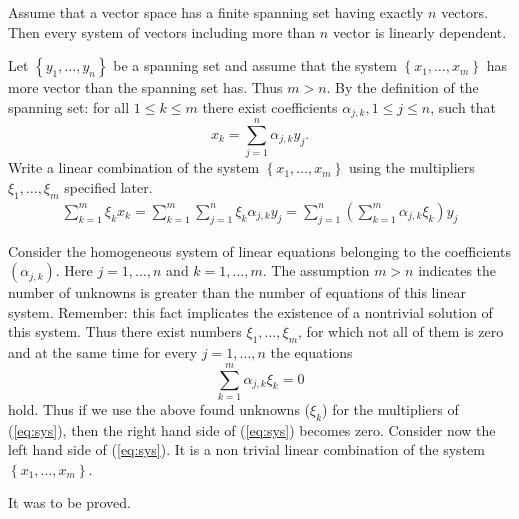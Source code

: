 \begin{frame}
\begin{lemma}[Steinitz]
    Assume that a vector space has a finite spanning set having exactly $n$ vectors.
    Then every system of vectors including more than $n$ vector is linearly dependent.
\end{lemma}
    Let $\left\{ y_1,\ldots,y_n \right\}$ be a spanning set
    and assume that the system  $\left\{ x_1,\ldots,x_m \right\}$ has more vector than the spanning set has.
    Thus $m>n$.
    By the definition of the spanning set: for all $1\leq k\leq m$ there exist coefficients 
    $\alpha_{j,k}, 1\leq j\leq n$, such that
    \[
        x_k=\sum_{j=1}^n\alpha_{j,k}y_j.
    \]
    Write a linear combination of the system $\left\{ x_1,\dots,x_m \right\}$ using the multipliers $\xi_1,\ldots,\xi_m$ specified later.
    \begin{eqnarray}
        \sum_{k=1}^m\xi_kx_k=
        \sum_{k=1}^m\sum_{j=1}^n\xi_k\alpha_{j,k}y_j=
        \sum_{j=1}^n\left( \sum_{k=1}^m\alpha_{j,k}\xi_k \right)y_j
        \label{eq:sys}
    \end{eqnarray}
\end{frame}
\begin{frame}
    Consider the homogeneous system of linear equations belonging to the coefficients $\left( \alpha_{j,k} \right)$.
    Here $j=1,\ldots,n$ and $k=1,\ldots,m$.
    The assumption $m>n$ indicates the number of unknowns is greater than the number of equations of this linear system.
    Remember: this fact implicates the existence of a nontrivial solution of this system.
    Thus there exist numbers $\xi_1,\ldots,\xi_m$, for which not all of them is zero
    and at the same time for every $j=1,\ldots,n$ the equations
    \[
        \sum_{k=1}^m\alpha_{j,k}\xi_k=0
    \]
    hold.
    Thus if we use the above found unknowns ($\xi_k$) for the multipliers of (\ref{eq:sys}), then the right hand side of (\ref{eq:sys}) becomes zero.
    Consider now the left hand side of (\ref{eq:sys}). 
    It is a non trivial linear combination of the system $\left\{ x_1,\ldots,x_m \right\}$.

    It was to be proved.
\end{frame}

